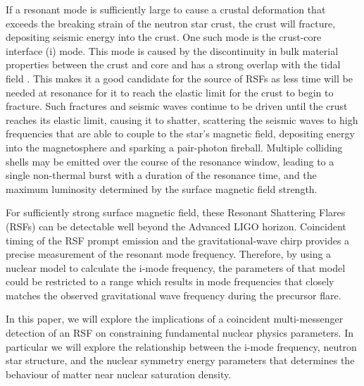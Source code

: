 \documentclass[fleqn,usenatbib]{mnras}
\begin{document}
\hspace{\parindent}If a resonant mode is sufficiently large to cause a crustal deformation that exceeds the breaking strain of the neutron star crust, the crust will fracture, depositing seismic energy into the crust. One such mode is the crust-core interface (i) mode. This mode is caused by the discontinuity in bulk material properties between the crust and core and has a strong overlap with the tidal field \citet{tsang2012resonant}. This makes it a good candidate for the source of RSFs as less time will be needed at resonance for it to reach the elastic limit for the crust to begin to fracture. Such fractures and seismic waves continue to be driven until the crust reaches its elastic limit, causing it to shatter, scattering the seismic waves to high frequencies that are able to couple to the star's magnetic field, depositing energy into the magnetosphere and sparking a pair-photon fireball. Multiple colliding shells may be emitted over the course of the resonance window, leading to a single non-thermal burst with a duration of the resonance time, and the maximum luminosity determined by the surface magnetic field strength. %

\hspace{\parindent}For sufficiently strong surface magnetic field, these Resonant Shattering Flares (RSFs) can be detectable well beyond the Advanced LIGO horizon. Coincident timing of the RSF prompt emission and the gravitational-wave chirp provides a precise measurement of the resonant mode frequency. Therefore, by using a nuclear model to calculate the i-mode frequency, the parameters of that model could be restricted to a range which results in mode frequencies that closely matches the observed gravitational wave frequency during the precursor flare. 

\hspace{\parindent}In this paper, we will explore the implications of a coincident multi-messenger detection of an RSF on constraining fundamental nuclear physics parameters. In particular we will explore the relationship between the i-mode frequency, neutron star structure, and the nuclear symmetry energy parameters that determines the behaviour of matter near nuclear saturation density. 
\end{document}
